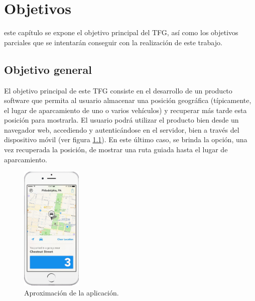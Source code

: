 \chapter{Objetivos}
\label{chap:objetivos}

\noindent

 este capítulo se expone el objetivo principal del \ac{TFG}, así como los objetivos parciales que se intentarán conseguir con la realización de este trabajo.

\section{Objetivo general}
El objetivo principal de este \ac{TFG} consiste en el desarrollo de un producto software que permita al usuario almacenar una posición geográfica (típicamente, el lugar de aparcamiento de uno o varios vehículos) y recuperar más tarde esta posición para mostrarla. El usuario podrá utilizar el producto bien desde un navegador web, accediendo y autenticándose en el servidor, bien a través del dispositivo móvil (ver figura \ref{fig:Preview_App}). En este último caso, se brinda la opción, una vez recuperada la posición, de mostrar una ruta guiada hasta el lugar de aparcamiento.

\begin{figure}[h!btp]
\centering
\includegraphics[height=60mm, fbox={\fboxrule} 4mm]{images/02-objetivos/01-telefono_parking.jpg}
\caption{Aproximación de la aplicación.}
\label{fig:Preview_App}
\end{figure}


